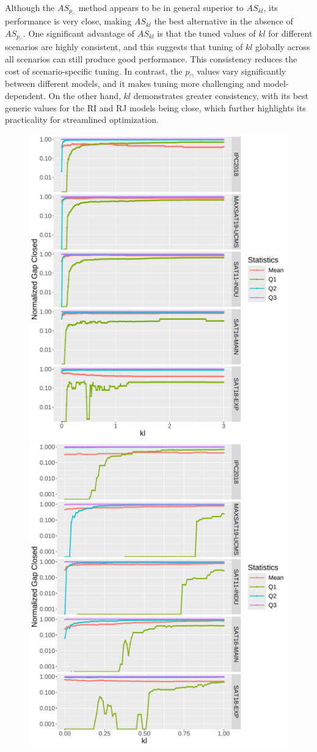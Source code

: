 Although the $AS_{p_\cap}$ method appears to be in general superior to $AS_{kl}$, its performance is very close, making $AS_{kl}$ the best alternative in the absence of $AS_{p_\cap}$. One significant advantage of $AS_{kl}$ is that the tuned values of $kl$ for different scenarios are highly consistent, and this suggests that tuning of $kl$ globally across all scenarios can still produce good performance. This consistency reduces the cost of scenario-specific tuning. In contrast, the $p_{\cap}$ values vary significantly between different models, and it makes tuning more challenging and model-dependent. On the other hand, $kl$ demonstrates greater consistency, with its best generic values for the RI and RJ models being close, which further highlights its practicality for streamlined optimization.

\begin{figure}
\centering
    \includegraphics[width=0.49\linewidth]{plots/kl_div_rfj_sensitivity_x_theta_y_runtime_facet.pdf}
    \includegraphics[width=0.49\linewidth]{plots/kl_ri_div_sensitivity_x_theta_y_runtime_facet.pdf}

\end{figure}
